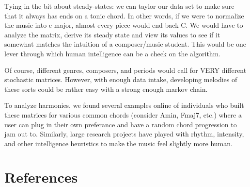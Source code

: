\documentclass{article}
\begin{document}
Tying in the bit about steady-states: we can taylor our data set to make sure that it always has ends on a tonic chord. In other words, if we were to normalize the music into c major, almost every piece would end back C. We would have to analyze the matrix, derive its steady state and view its values to see if it somewhat matches the intuition of a composer/music student. This would be one lever through which human intelligence can be a check on the algorithm.

Of course, different genres, composers, and periods would call for VERY different stochastic matrices. However, with enough data intake, developing melodies of these sorts could be rather easy with a strong enough markov chain.

To analyze harmonies, we found several examples online of individuals who built these matrices for various common chords (consider Amin, Fmaj7, etc.) where a user can plug in their own preferance and have a random chord progression to jam out to. Similarly, large research projects have played with rhythm, intensity, and other intelligence heuristics to make the music feel slightly more human.

\section{References}
\end{document}
